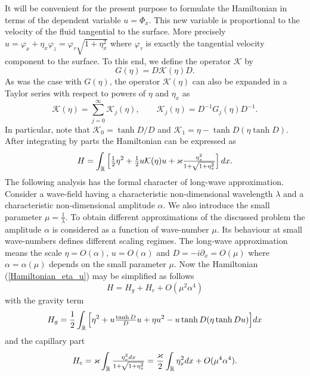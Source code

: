 It will be convenient for the present purpose to formulate the Hamiltonian
in terms of the dependent variable $u = \Phi_x$.
This new variable is proportional to the velocity of the fluid
tangential to the surface.
More precisely
\(
	u = \varphi_x + \eta_x \varphi_z
	= \varphi _{\tau} \sqrt{1 + \eta_x^2}
\)
where $\varphi _{\tau}$ is exactly the tangential
velocity component to the surface.
To this end, we define the operator $\mathcal{K}$ by
%
\begin{equation*}
	G(\eta) = D \mathcal{K}(\eta) D
	.
\end{equation*}
%
As was the case with $G(\eta)$, the operator $\mathcal{K}(\eta)$ 
can also be expanded in a Taylor series
with respect to powers of $\eta$ and $\eta_x$ as
%
\[
	\mathcal{K}(\eta) = \sum_{j=0}^\infty \mathcal{K}_j(\eta)
	, \qquad
	\mathcal{K}_j(\eta) = D^{-1}G_j(\eta)D^{-1}
	.
\]
%
In particular, note that $\mathcal{K}_0 = \tanh{D} / D$
and
$\mathcal{K}_1 = \eta - \tanh{D} (\eta \tanh{D})$.
After integrating by parts the Hamiltonian can be expressed as 
%
\begin{equation}
\label{Hamiltonian_eta_u}
	H  = \int_{\mathbb{R}} \Big[ {\textstyle{\frac{1}{2}}} \eta^2 + {\textstyle{\frac{1}{2}}} u \mathcal K(\eta) u
	+ \varkappa {\textstyle{\frac{ \eta_x^2 }{ 1 + \sqrt{1 + \eta_x^2} }}}	
	\Big] \, dx
	.
\end{equation}
%
The following analysis has the formal character of long-wave approximation.
Consider a wave-field having a characteristic non-dimensional wavelength
$\lambda$ and a characteristic non-dimensional amplitude $\alpha$.
We also introduce the small parameter $\mu = \frac{1}{\lambda}$.
To obtain different approximations of the discussed problem
the amplitude $\alpha$ is considered as a function of wave-number $\mu$.
Its behaviour at small wave-numbers defines different scaling regimes.
The long-wave approximation means the scale $\eta = O(\alpha)$,
$u = O(\alpha)$ and $D = - i \partial_x = O(\mu)$
where $\alpha = \alpha(\mu)$ depends on the small parameter $\mu$.
Now the Hamiltonian (\ref{Hamiltonian_eta_u}) may be simplified as follows
%
\begin{equation}
\label{Hamiltonian_expansion}
	H = H_g + H_c + O(\mu^2 \alpha^4)
\end{equation}
%
with the gravity term
%
\begin{equation}
\label{Hamiltonian0}
	H_g =
	\frac 12 \int_{\mathbb{R}}
	\Big[
		\eta^2 + u {\textstyle{\frac{\tanh D}{D}}} u + \eta u^2 -
		u \tanh{D} (\eta \tanh{D} u)
	\Big]
	dx
\end{equation}
%
and the capillary part
%
\begin{equation}
\label{Hamiltonian1}
	H_c
	=
	\varkappa \int_{\mathbb{R}} {\textstyle{\frac{ \eta_x^2 dx }{ 1 + \sqrt{1 + \eta_x^2} }}}	
	=
	\frac{\varkappa}{2} \int_{\mathbb{R}} \eta_x^2 dx 
	+ O(\mu^4 \alpha^4)
	.
\end{equation}
